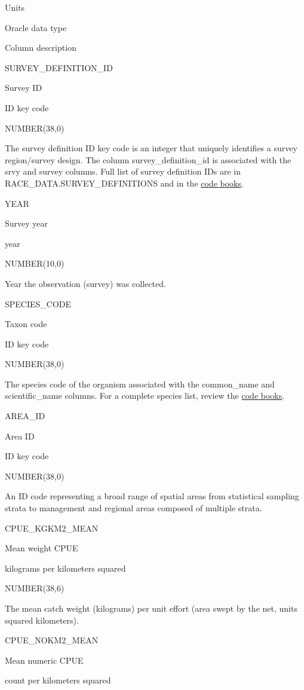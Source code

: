 \documentclass[
  letterpaper,
  oneside,
  open=any]{scrbook}
\begin{document}
Units

Oracle data type

Column description

SURVEY\_DEFINITION\_ID

Survey ID

ID key code

NUMBER(38,0)

The survey definition ID key code is an integer that uniquely identifies
a survey region/survey design. The column survey\_definition\_id is
associated with the srvy and survey columns. Full list of survey
definition IDs are in RACE\_DATA.SURVEY\_DEFINITIONS and in the
\href{https://www.fisheries.noaa.gov/resource/document/groundfish-survey-species-code-manual-and-data-codes-manual}{code
books}.

YEAR

Survey year

year

NUMBER(10,0)

Year the observation (survey) was collected.

SPECIES\_CODE

Taxon code

ID key code

NUMBER(38,0)

The species code of the organism associated with the common\_name and
scientific\_name columns. For a complete species list, review the
\href{https://www.fisheries.noaa.gov/resource/document/groundfish-survey-species-code-manual-and-data-codes-manual}{code
books}.

AREA\_ID

Area ID

ID key code

NUMBER(38,0)

An ID code representing a broad range of spatial areas from statistical
sampling strata to management and regional areas composed of multiple
strata.

CPUE\_KGKM2\_MEAN

Mean weight CPUE

kilograms per kilometers squared

NUMBER(38,6)

The mean catch weight (kilograms) per unit effort (area swept by the
net, units squared kilometers).

CPUE\_NOKM2\_MEAN

Mean numeric CPUE

count per kilometers squared
\end{document}
